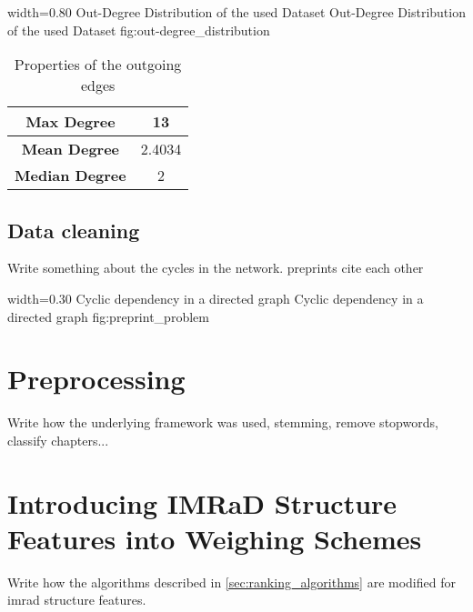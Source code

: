       {width=0.80\textwidth}
      {Out-Degree Distribution of the used Dataset}
      {Out-Degree Distribution of the used Dataset}
      {fig:out-degree_distribution}

\begin{table}
  \centering
  \begin{tabular}{ | c | c | }
    \hline
    \textbf{Max Degree} & 13 \\ \hline
    \textbf{Mean Degree} & 2.4034 \\ \hline
    \textbf{Median Degree} & 2 \\ \hline
  \end{tabular}
  \caption[Properties of the outgoing edges in the used dataset]{Properties of the outgoing edges}
  \label{tbl:properties_outgoing_edges}
\end{table}

\subsection{Data cleaning}
\label{subsec:data_cleaning}
Write something about the cycles in the network. preprints cite each other

      {width=0.30\textwidth}
      {Cyclic dependency in a directed graph}
      {Cyclic dependency in a directed graph}
      {fig:preprint_problem}


\section{Preprocessing}
\label{sec:preprocessing}

Write how the underlying framework was used, stemming, remove stopwords, classify chapters...

\section{Introducing IMRaD Structure Features into Weighing Schemes}

Write how the algorithms described in \cref{sec:ranking_algorithms} are modified for imrad structure features.
